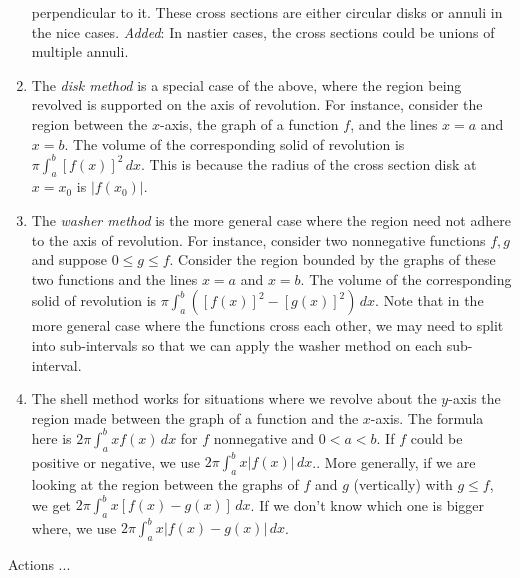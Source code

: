 \documentclass[10pt]{amsart}
\begin{document}
\begin{enumerate}
  perpendicular to it. These cross sections are either circular disks
  or annuli in the nice cases. {\em Added}: In nastier cases, the cross
  sections could be unions of multiple annuli.
\item The {\em disk method} is a special case of the above, where the
  region being revolved is supported on the axis of revolution. For
  instance, consider the region between the $x$-axis, the graph of a
  function $f$, and the lines $x = a$ and $x = b$. The volume of the
  corresponding solid of revolution is $\pi \int_a^b [f(x)]^2 \,
  dx$. This is because the radius of the cross section disk at $x=
  x_0$ is $|f(x_0)|$.
\item The {\em washer method} is the more general case where the
  region need not adhere to the axis of revolution. For instance,
  consider two nonnegative functions $f,g$ and suppose $0 \le g \le
  f$. Consider the region bounded by the graphs of these two functions
  and the lines $x = a$ and $x = b$. The volume of the corresponding
  solid of revolution is $\pi \int_a^b ([f(x)]^2 - [g(x)]^2) \,
  dx$. Note that in the more general case where the functions cross
  each other, we may need to split into sub-intervals so that we can
  apply the washer method on each sub-interval.
\item The shell method works for situations where we revolve about the
  $y$-axis the region made between the graph of a function and the
  $x$-axis. The formula here is $2\pi \int_a^b xf(x) \, dx$ for $f$
  nonnegative and $0 < a < b$. If $f$ could be positive or negative,
  we use $2 \pi \int_a^b x|f(x)| \, dx$.. More generally, if we are
  looking at the region between the graphs of $f$ and $g$ (vertically)
  with $g \le f$, we get $2\pi \int_a^b x[f(x) - g(x)] \, dx$. If we
  don't know which one is bigger where, we use $2\pi \int_a^b x|f(x) -
  g(x)| \, dx$.
\end{enumerate}

Actions ...
\end{document}
